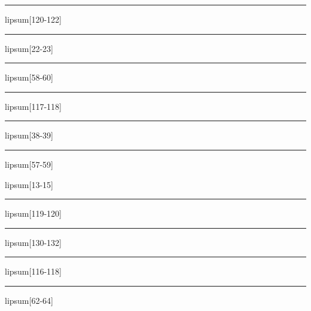 \documentclass[11pt,a4paper]{article}
\begin{document}
\begin{simplewrap}
  \textcolor{red!29}{\rule{3.9cm}{5.4cm}}
\end{simplewrap}
lipsum[120-122]

\begin{simplewrap}
  \textcolor{yellow!42}{\rule{4.4cm}{9.2cm}}
\end{simplewrap}
lipsum[22-23]

\begin{simplewrap}
  \textcolor{brown!15}{\rule{5.5cm}{8.0cm}}
\end{simplewrap}
lipsum[58-60]

\begin{simplewrap}
  \textcolor{purple!11}{\rule{3.1cm}{9.9cm}}
\end{simplewrap}
lipsum[117-118]

\begin{simplewrap}
  \textcolor{yellow!55}{\rule{5.1cm}{6.0cm}}
\end{simplewrap}
lipsum[38-39]

\begin{simplewrap}
  \textcolor{red!58}{\rule{5.6cm}{9.1cm}}
\end{simplewrap}
lipsum[57-59]

lipsum[13-15]

\begin{simplewrap}
  \textcolor{magenta!25}{\rule{5.8cm}{3.0cm}}
\end{simplewrap}
lipsum[119-120]

\begin{simplewrap}
  \textcolor{magenta!48}{\rule{4.0cm}{8.0cm}}
\end{simplewrap}
lipsum[130-132]

\begin{simplewrap}
  \textcolor{magenta!38}{\rule{5.7cm}{7.9cm}}
\end{simplewrap}
lipsum[116-118]

\begin{simplewrap}
  \textcolor{magenta!50}{\rule{3.8cm}{8.2cm}}
\end{simplewrap}
lipsum[62-64]
\end{document}
